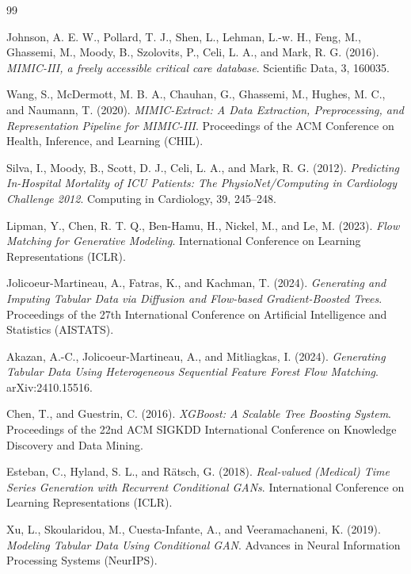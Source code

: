 \documentclass[11pt]{informatics-report}
\begin{document}

\begin{thebibliography}{99}

Johnson, A. E. W., Pollard, T. J., Shen, L., Lehman, L.-w. H., Feng, M., Ghassemi, M.,
Moody, B., Szolovits, P., Celi, L. A., and Mark, R. G. (2016).
\textit{MIMIC-III, a freely accessible critical care database}.
Scientific Data, 3, 160035.

Wang, S., McDermott, M. B. A., Chauhan, G., Ghassemi, M., Hughes, M. C., and Naumann, T. (2020).
\textit{MIMIC-Extract: A Data Extraction, Preprocessing, and Representation Pipeline for MIMIC-III}.
Proceedings of the ACM Conference on Health, Inference, and Learning (CHIL).

Silva, I., Moody, B., Scott, D. J., Celi, L. A., and Mark, R. G. (2012).
\textit{Predicting In-Hospital Mortality of ICU Patients: The PhysioNet/Computing in Cardiology Challenge 2012}.
Computing in Cardiology, 39, 245--248.

Lipman, Y., Chen, R. T. Q., Ben-Hamu, H., Nickel, M., and Le, M. (2023).
\textit{Flow Matching for Generative Modeling}.
International Conference on Learning Representations (ICLR).

Jolicoeur-Martineau, A., Fatras, K., and Kachman, T. (2024).
\textit{Generating and Imputing Tabular Data via Diffusion and Flow-based Gradient-Boosted Trees}.
Proceedings of the 27th International Conference on Artificial Intelligence and Statistics (AISTATS).

Akazan, A.-C., Jolicoeur-Martineau, A., and Mitliagkas, I. (2024).
\textit{Generating Tabular Data Using Heterogeneous Sequential Feature Forest Flow Matching}.
arXiv:2410.15516.

Chen, T., and Guestrin, C. (2016).
\textit{XGBoost: A Scalable Tree Boosting System}.
Proceedings of the 22nd ACM SIGKDD International Conference on Knowledge Discovery and Data Mining.

Esteban, C., Hyland, S. L., and R{\"a}tsch, G. (2018).
\textit{Real-valued (Medical) Time Series Generation with Recurrent Conditional GANs}.
International Conference on Learning Representations (ICLR).

Xu, L., Skoularidou, M., Cuesta-Infante, A., and Veeramachaneni, K. (2019).
\textit{Modeling Tabular Data Using Conditional GAN}.
Advances in Neural Information Processing Systems (NeurIPS).


\end{thebibliography}
\end{document}
